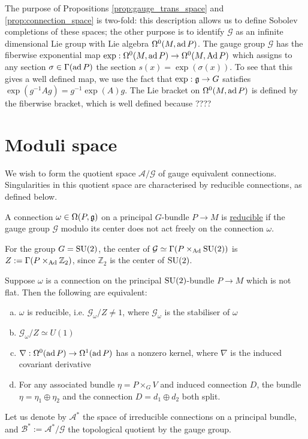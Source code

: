 The purpose of Propositions \ref{prop:gauge_trans_space} and
\ref{prop:connection_space} is two-fold: this description allows us to 
define Sobolev completions of these spaces; the other 
purpose is to identify $\mathcal{G}$ as an infinite dimensional Lie group with 
Lie algebra $\Omega^0(M,\operatorname{ad} P)$.
The gauge group $\mathcal{G}$ has  
the fiberwise exponential map $\exp : \Omega^0(M,\operatorname{ad} P) \to
\Omega^0(M,\operatorname{Ad} P)$ which assigns to any section  $\sigma \in \Gamma(\operatorname{ad} P)$ the
section  $s(x)=\exp(\sigma(x))$. To see that this gives a well defined map, we
use the fact that  $\exp : \operatorname{\mathfrak{g}} \to G$ satisfies
$\exp(g^{-1}Ag)=g^{-1}\exp(A)g$. The Lie bracket on $\Omega^0(M,\operatorname{ad} P)$ is
defined by the fiberwise bracket, which is well defined because ????



\section{Moduli space}
We wish to form the quotient space $\mathcal{A} /\mathcal{G}$ of gauge equivalent connections.  
Singularities in this quotient space are characterised by reducible connections,
as defined below.
\begin{defn} %
	A connection $\omega\in \Omega(P,\operatorname{\mathfrak{g}})$ on a principal $G$-bundle  $P\to M$ 
	is \underline{reducible} if the gauge group $\mathcal{G}$ modulo its center 
	does not act freely on the connection $\omega$.
\end{defn}
\noindent
For the group $G=\operatorname{SU}(2)$, the center of 
$\mathcal{G}\simeq \Gamma(P\times_{\operatorname{Ad}} \operatorname{SU}(2))$ is $Z:=\Gamma(P\times_{\operatorname{Ad}}
\mathbb{Z}_2)$, since $\mathbb{Z}_2$ is the center of $\operatorname{SU}(2)$. 

\begin{thm} %
	Suppose $\omega$ is a connection on the principal $\operatorname{SU}(2)$-bundle  $P\to M$ 
	which is not flat. Then the following are equivalent:
	\begin{enumerate}[(a)]
		\item  $\omega$ is reducible, i.e.  $\mathcal{G}_\omega / Z \neq 1$, 
			where $\mathcal{G}_\omega$ is the stabiliser of $\omega$
	    \item $\mathcal{G}_{\omega} / Z \simeq U(1)$ 	
		\item $\nabla : \Omega^0(\operatorname{ad} P) \to \Omega^1(\operatorname{ad} P)$ has a nonzero
			kernel, where  $\nabla$ is the induced covariant derivative
		\item For any associated bundle $\eta = P\times_G V$ and induced 
			connection $D$,  the bundle $\eta = \eta_1 \oplus \eta_2$ and the
			connection $D= d_1\oplus d_2$ both split.
	\end{enumerate}
\end{thm}
Let us denote by $\mathcal{A}^*$ the space of irreducible connections on a
principal bundle, and $\mathcal{B}^* := \mathcal{A^*} / \mathcal{G}$ the
topological quotient by the gauge group. 

